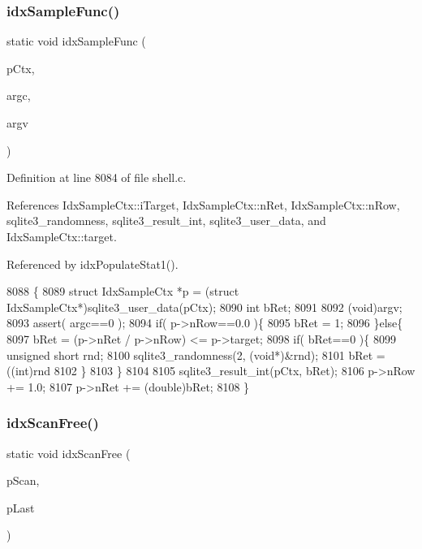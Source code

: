 \subsubsection{idx\+Sample\+Func()}
{\footnotesize\ttfamily static void idx\+Sample\+Func (\begin{DoxyParamCaption}\item[{\textbf{ sqlite3\+\_\+context} $\ast$}]{p\+Ctx,  }\item[{int}]{argc,  }\item[{\textbf{ sqlite3\+\_\+value} $\ast$$\ast$}]{argv }\end{DoxyParamCaption})\hspace{0.3cm}{\ttfamily [static]}}



Definition at line 8084 of file shell.\+c.



References Idx\+Sample\+Ctx\+::i\+Target, Idx\+Sample\+Ctx\+::n\+Ret, Idx\+Sample\+Ctx\+::n\+Row, sqlite3\+\_\+randomness, sqlite3\+\_\+result\+\_\+int, sqlite3\+\_\+user\+\_\+data, and Idx\+Sample\+Ctx\+::target.



Referenced by idx\+Populate\+Stat1().


\begin{DoxyCode}
8088  \{
8089   \textcolor{keyword}{struct }IdxSampleCtx *p = (\textcolor{keyword}{struct }IdxSampleCtx*)sqlite3_user_data(pCtx);
8090   \textcolor{keywordtype}{int} bRet;
8091 
8092   (void)argv;
8093   assert( argc==0 );
8094   \textcolor{keywordflow}{if}( p->nRow==0.0 )\{
8095     bRet = 1;
8096   \}\textcolor{keywordflow}{else}\{
8097     bRet = (p->nRet / p->nRow) <= p->target;
8098     \textcolor{keywordflow}{if}( bRet==0 )\{
8099       \textcolor{keywordtype}{unsigned} \textcolor{keywordtype}{short} rnd;
8100       sqlite3_randomness(2, (\textcolor{keywordtype}{void}*)&rnd);
8101       bRet = ((int)rnd %
8102     \}
8103   \}
8104 
8105   sqlite3_result_int(pCtx, bRet);
8106   p->nRow += 1.0;
8107   p->nRet += (double)bRet;
8108 \}
\end{DoxyCode}
\mbox{\label{shell_8c_ab1eca350dbd64c20a657fb4f20418281}} 
\subsubsection{idx\+Scan\+Free()}
{\footnotesize\ttfamily static void idx\+Scan\+Free (\begin{DoxyParamCaption}\item[{\textbf{ Idx\+Scan} $\ast$}]{p\+Scan,  }\item[{\textbf{ Idx\+Scan} $\ast$}]{p\+Last }\end{DoxyParamCaption})\hspace{0.3cm}{\ttfamily [static]}}



